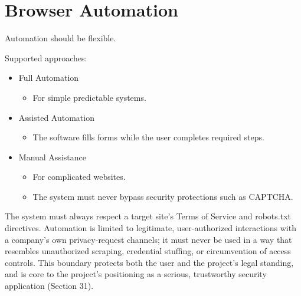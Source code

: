 
\chapter{Browser Automation}

Automation should be flexible.

Supported approaches:

\begin{itemize}
	\item Full Automation	
	\begin{itemize}
		\item For simple predictable systems.
	\end{itemize}
	\item Assisted Automation
	\begin{itemize}
		\item The software fills forms while the user completes required steps.
	\end{itemize}
	\item Manual Assistance
	\begin{itemize}
		\item For complicated websites.
		\item The system must never bypass security protections such as CAPTCHA.
	\end{itemize}
\end{itemize}

The system must always respect a target site's Terms of Service and robots.txt directives. Automation is limited to legitimate, user-authorized interactions with a company's own privacy-request channels; it must never be used in a way that resembles unauthorized scraping, credential stuffing, or circumvention of access controls. This boundary protects both the user and the project's legal standing, and is core to the project's positioning as a serious, trustworthy security application (Section 31).

\sentinelchapterend
